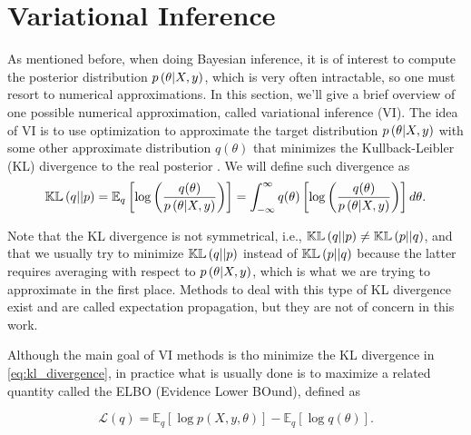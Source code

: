
\section{Variational Inference}

As mentioned before, when doing Bayesian inference, it is of interest to compute the posterior distribution $p\left( \theta | X, y \right)$, which is very often intractable, so one must resort to numerical approximations. In this section, we'll give a brief overview of one possible numerical approximation, called variational inference (VI). The idea of VI is to use optimization to approximate the target distribution $p\left( \theta | X, y \right)$ with some other approximate distribution $q(\theta)$ that minimizes the Kullback-Leibler (KL) divergence to the real posterior \cite{blei2017variational}. We will define such divergence as
\begin{equation}
  \label{eq:kl_divergence}
  \mathbb{KL}\left( q || p \right) = \mathbb{E}_q \left[ \log \left( \frac{q(\theta)}{p\left( \theta | X, y \right)} \right) \right] = \int_{-\infty}^{\infty} q(\theta) \left[ \log \left( \frac{q(\theta)}{p\left( \theta | X, y \right)} \right) \right] d\theta.
\end{equation}

Note that the KL divergence is not symmetrical, i.e., $\mathbb{KL}\left( q || p \right) \neq \mathbb{KL}\left( p || q \right)$, and that we usually try to minimize $\mathbb{KL}\left( q || p \right)$ instead of $\mathbb{KL}\left( p || q \right)$ because the latter requires averaging with respect to $p\left( \theta | X, y \right)$, which is what we are trying to approximate in the first place. Methods to deal with this type of KL divergence exist and are called expectation propagation, but they are not of concern in this work.

Although the main goal of VI methods is tho minimize the KL divergence in \ref{eq:kl_divergence}, in practice what is usually done is to maximize a related quantity called the ELBO (Evidence Lower BOund), defined as

\begin{equation}
  \label{eq:elbo_def}
  \mathcal{L}(q) = \mathbb{E}_q\left[ \log p(X, y, \theta) \right] - \mathbb{E}_q\left[ \log q(\theta) \right].
\end{equation}

